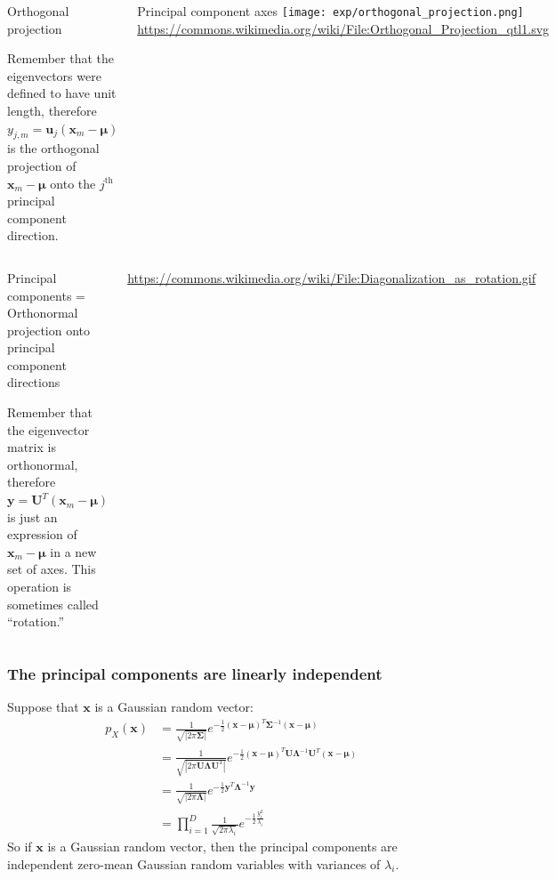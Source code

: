 \documentclass{beamer}
\begin{document}
\begin{frame}
  \begin{columns}
    \column{1.75in}
    \begin{block}{Orthogonal projection}

      Remember that the eigenvectors were defined to have unit length,
      therefore $y_{j,m}=\mathbf{u}_j(\mathbf{x}_m-\bm{\mu})$ is
      the orthogonal projection of $\mathbf{x}_m-\bm{\mu}$ onto
      the $j^{\text{th}}$ principal component direction.
    \end{block}
    \column{2.625in}
    \begin{block}{Principal component axes}
      \texttt{[image: exp/orthogonal\_projection.png]}
      {\footnotesize\url{https://commons.wikimedia.org/wiki/File:Orthogonal_Projection_qtl1.svg}}
    \end{block}
  \end{columns}
\end{frame}

\begin{frame}
  \begin{columns}
    \column{1.75in}
    \begin{block}{Principal components = Orthonormal projection onto principal component directions}

      Remember that the eigenvector matrix is orthonormal,
      therefore $\mathbf{y}=\mathbf{U}^T(\mathbf{x}_m-\bm{\mu})$ is
      just an expression of $\mathbf{x}_m-\bm{\mu}$ in a
      new set of axes.   This operation is sometimes called ``rotation.''
    \end{block}
    \column{2.625in}
    \begin{block}{}
      \centerline{}
      {\footnotesize\url{https://commons.wikimedia.org/wiki/File:Diagonalization_as_rotation.gif}}
    \end{block}
  \end{columns}
\end{frame}


\begin{frame}
  \frametitle{The principal components are linearly independent}

  Suppose that $\mathbf{x}$ is a Gaussian random vector:
  \begin{align*}
    p_X(\mathbf{x})
    &=\frac{1}{\sqrt{|2\pi\bm{\Sigma}|}}
    e^{-\frac{1}{2}(\mathbf{x}-\bm{\mu})^T\bm{\Sigma}^{-1}(\mathbf{x}-\bm{\mu})}\\
    &=\frac{1}{\sqrt{|2\pi\mathbf{U}\bm{\Lambda}\mathbf{U}^T|}}
    e^{-\frac{1}{2}(\mathbf{x}-\bm{\mu})^T\mathbf{U}\bm{\Lambda}^{-1}\mathbf{U}^T(\mathbf{x}-\bm{\mu})}\\
    &=\frac{1}{\sqrt{|2\pi\bm{\Lambda}|}}
    e^{-\frac{1}{2}\mathbf{y}^T\bm{\Lambda}^{-1}\mathbf{y}}\\
    &= \prod_{i=1}^D \frac{1}{\sqrt{2\pi\lambda_i}}
    e^{-\frac{1}{2}\frac{y_i^2}{\lambda_i}}
  \end{align*}
  So if $\mathbf{x}$ is a Gaussian random vector, then the principal
  components are independent zero-mean Gaussian random variables with
  variances of $\lambda_i$.
\end{frame}
  
\end{document}
